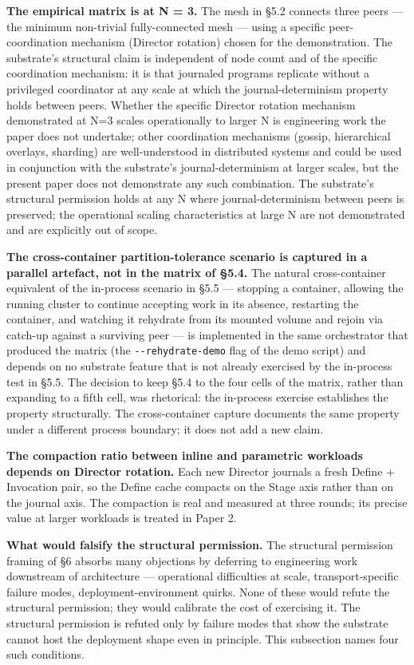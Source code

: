 \documentclass[
]{article}
\begin{document}
\textbf{The empirical matrix is at N = 3.} The mesh in §5.2 connects
three peers --- the minimum non-trivial fully-connected mesh --- using a
specific peer-coordination mechanism (Director rotation) chosen for the
demonstration. The substrate's structural claim is independent of node
count and of the specific coordination mechanism: it is that journaled
programs replicate without a privileged coordinator at any scale at
which the journal-determinism property holds between peers. Whether the
specific Director rotation mechanism demonstrated at N=3 scales
operationally to larger N is engineering work the paper does not
undertake; other coordination mechanisms (gossip, hierarchical overlays,
sharding) are well-understood in distributed systems and could be used
in conjunction with the substrate's journal-determinism at larger
scales, but the present paper does not demonstrate any such combination.
The substrate's structural permission holds at any N where
journal-determinism between peers is preserved; the operational scaling
characteristics at large N are not demonstrated and are explicitly out
of scope.

\textbf{The cross-container partition-tolerance scenario is captured in
a parallel artefact, not in the matrix of §5.4.} The natural
cross-container equivalent of the in-process scenario in §5.5 ---
stopping a container, allowing the running cluster to continue accepting
work in its absence, restarting the container, and watching it rehydrate
from its mounted volume and rejoin via catch-up against a surviving peer
--- is implemented in the same orchestrator that produced the matrix
(the \texttt{-\/-rehydrate-demo} flag of the demo script) and depends on
no substrate feature that is not already exercised by the in-process
test in §5.5. The decision to keep §5.4 to the four cells of the matrix,
rather than expanding to a fifth cell, was rhetorical: the in-process
exercise establishes the property structurally. The cross-container
capture documents the same property under a different process boundary;
it does not add a new claim.

\textbf{The compaction ratio between inline and parametric workloads
depends on Director rotation.} Each new Director journals a fresh Define
+ Invocation pair, so the Define cache compacts on the Stage axis rather
than on the journal axis. The compaction is real and measured at three
rounds; its precise value at larger workloads is treated in Paper 2.

\textbf{What would falsify the structural permission.} The structural
permission framing of §6 absorbs many objections by deferring to
engineering work downstream of architecture --- operational difficulties
at scale, transport-specific failure modes, deployment-environment
quirks. None of these would refute the structural permission; they would
calibrate the cost of exercising it. The structural permission is
refuted only by failure modes that show the substrate cannot host the
deployment shape even in principle. This subsection names four such
conditions.
\end{document}
